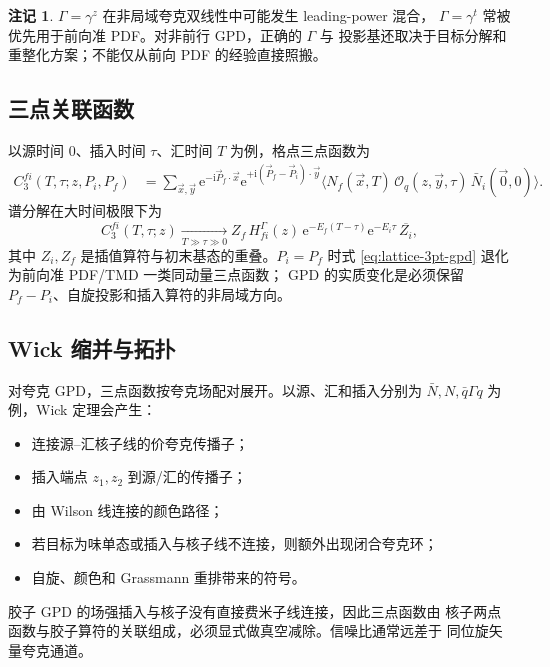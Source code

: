 \documentclass[12pt,a4paper]{ctexart}
\theoremstyle{definition}
\newtheorem{remark}{注记}[section]
\newcommand{\ii}{\mathrm{i}}
\newcommand{\ee}{\mathrm{e}}
\begin{document}
\begin{remark}
$\Gamma=\gamma^z$ 在非局域夸克双线性中可能发生 leading-power 混合，
$\Gamma=\gamma^t$ 常被优先用于前向准 PDF。对非前行 GPD，正确的 $\Gamma$ 与
投影基还取决于目标分解和重整化方案；不能仅从前向 PDF 的经验直接照搬。
\end{remark}

\subsection{三点关联函数}

以源时间 $0$、插入时间 $\tau$、汇时间 $T$ 为例，格点三点函数为
\begin{equation}
\begin{aligned}
C_3^{fi}(T,\tau;z,P_i,P_f)
&=\sum_{\vec x,\vec y}
\ee^{-\ii\vec P_f\cdot\vec x}
\ee^{+\ii(\vec P_f-\vec P_i)\cdot\vec y}
\Big\langle
N_f(\vec x,T)\,
\mathcal O_q(z,\vec y,\tau)\,
\bar N_i(\vec 0,0)
\Big\rangle .
\end{aligned}
\label{eq:lattice-3pt-gpd}
\end{equation}
谱分解在大时间极限下为
\begin{equation}
C_3^{fi}(T,\tau;z)
\xrightarrow[T\gg\tau\gg0]{}
Z_f\,H^{\Gamma}_{fi}(z)\,\ee^{-E_f(T-\tau)}
\ee^{-E_i\tau}\,\overline{Z_i},
\label{eq:3pt-ground-state}
\end{equation}
其中 $Z_i,Z_f$ 是插值算符与初末基态的重叠。$P_i=P_f$ 时式
\eqref{eq:lattice-3pt-gpd} 退化为前向准 PDF/TMD 一类同动量三点函数；
GPD 的实质变化是必须保留 $P_f-P_i$、自旋投影和插入算符的非局域方向。

\subsection{Wick 缩并与拓扑}

对夸克 GPD，三点函数按夸克场配对展开。以源、汇和插入分别为
$\bar N,N,\bar q\Gamma q$ 为例，Wick 定理会产生：
\begin{itemize}[leftmargin=*]
  \item 连接源--汇核子线的价夸克传播子；
  \item 插入端点 $z_1,z_2$ 到源/汇的传播子；
  \item 由 Wilson 线连接的颜色路径；
  \item 若目标为味单态或插入与核子线不连接，则额外出现闭合夸克环；
  \item 自旋、颜色和 Grassmann 重排带来的符号。
\end{itemize}
胶子 GPD 的场强插入与核子没有直接费米子线连接，因此三点函数由
核子两点函数与胶子算符的关联组成，必须显式做真空减除。信噪比通常远差于
同位旋矢量夸克通道。
\end{document}
